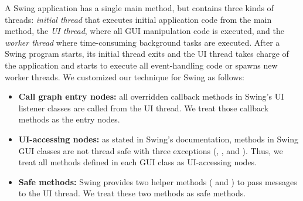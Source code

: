 
A Swing application has a single main method, but contains three kinds of
threads: \textit{initial thread} that executes initial application code from the main method,
the \textit{UI thread}, where all GUI manipulation code is executed,
and the \textit{worker thread} where time-consuming background tasks are executed.
After a Swing program starts, its initial thread exits and the UI thread takes charge
of the application and starts to execute all event-handling code or spawns new worker threads. 
We customized our technique for Swing as follows:

\begin{itemize}

\item \textbf{Call graph entry nodes: } all overridden callback methods in 
Swing's UI listener classes are called from the UI thread. We treat those callback
methods as the entry nodes.


\item \textbf{UI-accessing nodes:} as stated in Swing's documentation, methods
in Swing GUI classes are not thread safe with three exceptions (,
, and ). Thus, we
treat all methods defined in each GUI class as UI-accessing nodes.

\item \textbf{Safe methods: }  Swing provides two helper methods
( and ) to pass messages to the UI thread.
We treat these two methods as safe methods.

\end{itemize}


